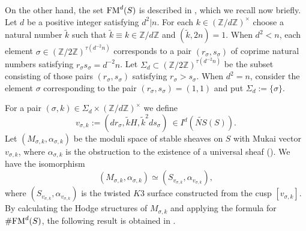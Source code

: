 \documentclass{article}
\theoremstyle{plain}
\theoremstyle{definition}
\theoremstyle{remark}
\newcommand{\Z}{{\mathbb Z}}
\begin{document}







On the other hand, 
the set ${\rm FM\/}^{d}(S)$ is described in \cite{Ma2},    
which we recall now briefly.  
Let $d$ be a positive integer satisfying $d^{2}|n$. 
For each $k \in ({\Z}/d{\Z})^{\times}$ 
choose a natural number $\tilde{k}$ 
such that $\tilde{k} \equiv k \in {\Z}/d{\Z}$ 
and $(\tilde{k}, 2n)=1$. 
When $d^{2}<n$, 
each element $\sigma \in ({\Z}/2{\Z})^{\tau (d^{-2}n)}$ 
corresponds to 
a pair $(r_{\sigma},  s_{\sigma})$ of coprime natural numbers  
satisfying 
$r_{\sigma}s_{\sigma} = d^{-2}n$. 
Let 
$\Sigma _{d} \subset ({\Z}/2{\Z})^{\tau (d^{-2}n)}$ 
be the subset 
consisting of those pairs $(r_{\sigma},  s_{\sigma})$ 
satisfying $r_{\sigma}>s_{\sigma}$. 
When $d^{2}=n$, 
consider the element $\sigma $ 
corresponding to the pair $(r_{\sigma}, s_{\sigma}) = (1, 1)$ 
and put $\Sigma _{d} := \{ \sigma \} $. 






For a pair $(\sigma , k) \in \Sigma _{d} \times ({\Z}/d{\Z})^{\times}$  
we define 
\begin{equation*}\label{Mukai vectors}
v_{\sigma , k} := 
(dr_{\sigma}, \tilde{k}H, \tilde{k}^{2}ds_{\sigma}) \: 
\in I^{d}(\widetilde{NS}(S)). 
\end{equation*} 
Let 
$(M_{\sigma , k}, \alpha _{\sigma , k})$ 
be the moduli space of stable sheaves on $S$ 
with Mukai vector $v_{\sigma , k}$, 
where 
$\alpha _{\sigma , k}$ 
is the obstruction to the existence of a universal sheaf (\cite{Ca2}). 
We have the isomorphism 
\begin{equation*}
(M_{\sigma , k}, \alpha _{\sigma , k}) 
\simeq 
(S_{v_{\sigma , k}}, \alpha _{v_{\sigma , k}}), 
\end{equation*} 
where 
$(S_{v_{\sigma , k}}, \alpha _{v_{\sigma , k}})$ 
is the twisted $K3$ surface 
constructed from the cusp $[v_{\sigma , k}]$. 
By calculating the Hodge structures of $M_{\sigma , k}$ 
and applying the formula for $\# {\rm FM\/}^{d}(S)$, 
the following result is obtained in \cite{Ma2}.  
\end{document}
